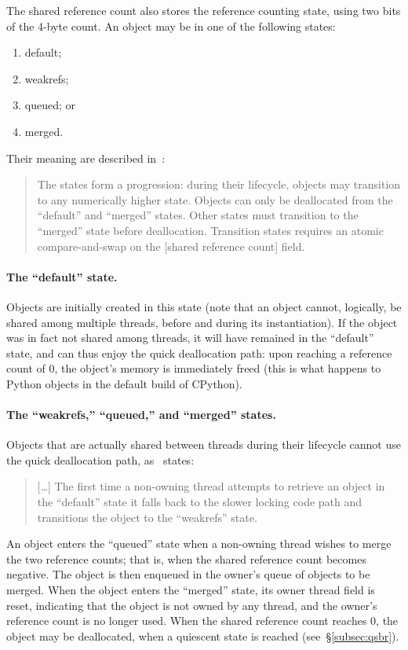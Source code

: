 The shared reference count also stores the reference counting state, using two bits of the 4-byte count.
An object may be in one of the following states:
\begin{enumerate}
    \item default;
    \item weakrefs;
    \item queued; or
    \item merged.
\end{enumerate}

Their meaning are described in~\cite[\S Biased Reference Counting]{pep703}:
\begin{quote}
    The states form a progression: during their lifecycle, objects may transition to any numerically higher state.
    Objects can only be deallocated from the ``default'' and ``merged'' states.
    Other states must transition to the ``merged'' state before deallocation.
    Transition states requires an atomic compare-and-swap on the [shared reference count] field.
\end{quote}

\paragraph{The ``default'' state.}
Objects are initially created in this state (note that an object cannot, logically, be shared among multiple threads, before and during its instantiation).
If the object was in fact not shared among threads, it will have remained in the ``default'' state, and can thus enjoy the quick deallocation path: upon reaching a reference count of 0, the object's memory is immediately freed (this is what happens to Python objects in the default build of CPython).

\paragraph{The ``weakrefs,'' ``queued,'' and ``merged'' states.}
Objects that are actually shared between threads during their lifecycle cannot use the quick deallocation path, as~\cite[]{pep703} states:
\begin{quote}
    [\ldots] The first time a non-owning thread attempts to retrieve an object in the ``default'' state it falls back to the slower locking code path and transitions the object to the ``weakrefs'' state.
\end{quote}

An object enters the ``queued'' state when a non-owning thread wishes to merge the two reference counts; that is, when the shared reference count becomes negative.
The object is then enqueued in the owner's queue of objects to be merged.
When the object enters the ``merged'' state, its owner thread field is reset, indicating that the object is not owned by any thread, and the owner's reference count is no longer used.
When the shared reference count reaches 0, the object may be deallocated, when a quiescent state is reached (see~\S\ref{subsec:qsbr}).

